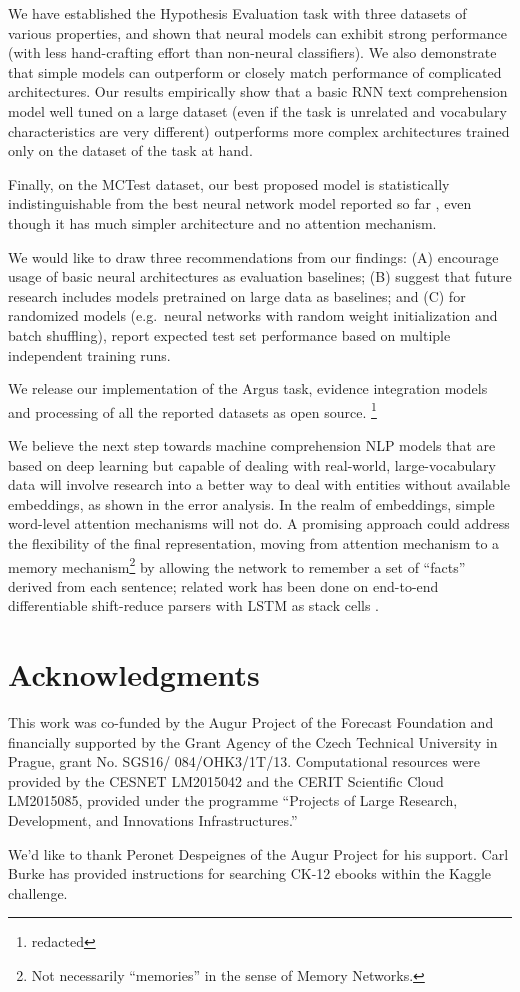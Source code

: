 \documentclass[11pt]{article}
\begin{document}
We have established the Hypothesis Evaluation task with three datasets
of various properties, and shown that neural models can exhibit strong
performance (with less hand-crafting effort than non-neural classifiers).
We also demonstrate that simple models can outperform or closely match
performance of complicated architectures.
Our results empirically show that a basic RNN text comprehension model
well tuned on a large dataset (even if the task is unrelated and vocabulary
characteristics are very different) outperforms more complex architectures
trained only on the dataset of the task at hand.

Finally, on the MCTest dataset, our best proposed model is statistically
indistinguishable from the best neural network model reported so far
\cite{HABCNN},
even though it has much simpler architecture and no attention mechanism.

We would like to draw three recommendations from our findings:
(A) encourage usage of basic neural architectures as evaluation baselines;
(B) suggest that future research includes models pretrained on large data as
baselines; and
(C) for randomized models (e.g.\ neural networks with random weight
initialization and batch shuffling), report expected test set performance
based on multiple independent training runs.

We release our implementation of the Argus task, evidence integration
models and processing of all the reported datasets as open source.%
\footnote{redacted}

We believe the next step towards machine comprehension NLP models
that are based on deep learning but capable of dealing with real-world,
large-vocabulary data will involve research into a better way to deal with
entities without available embeddings, as shown in the error analysis.
In the realm of embeddings, simple word-level attention mechanisms will not do.
A promising approach could address
the flexibility of the final representation, moving from attention mechanism
to a memory mechanism\footnote{Not necessarily ``memories'' in the sense of Memory Networks.}
by allowing the network to remember a set of ``facts'' derived from each sentence;
related work has been done on end-to-end differentiable shift-reduce parsers
with LSTM as stack cells \cite{EndToEndParsing}.


\section*{Acknowledgments}
{\footnotesize
	This work was co-funded by the Augur Project of the Forecast Foundation
and financially supported by the Grant Agency of the Czech Technical
University in Prague, grant No. SGS16/ 084/OHK3/1T/13.
Computational resources were provided by the CESNET LM2015042 and the CERIT Scientific Cloud LM2015085,
provided under the programme ``Projects of Large Research, Development, and Innovations Infrastructures.''

We'd like to thank Peronet Despeignes of the Augur Project for his support.
Carl Burke has provided instructions for searching CK-12 ebooks within
the Kaggle challenge.}



\end{document}
